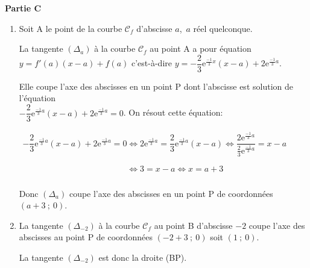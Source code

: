 \documentclass[10pt]{article}
\providecommand{\e}{{\mathrm{e}}}
\begin{document}
\textbf{Partie C}

\medskip

\begin{enumerate}

\item Soit A le point de la courbe $\mathcal{C}_f$ d'abscisse $a$,\, $a$ réel quelconque.

La tangente $\left(\Delta_a\right)$ à la courbe $\mathcal{C}_f$ au point A a pour équation
$y=f'(a) \left (x-a\right )+f(a)$ c'est-à-dire 
$y=-\dfrac{2}{3}\e^{\frac{-1}{3}x}\left (x-a\right )+2\e^{\frac{-1}{3}a}$.

Elle coupe l'axe des abscisses en un point P dont l'abscisse est solution de l'équation \\
$-\dfrac{2}{3}\e^{\frac{-1}{3}a}\left (x-a\right )+2\e^{\frac{-1}{3}a} = 0$.
On résout cette équation:

$\begin{gathered}-\dfrac{2}{3}\e^{\frac{-1}{3}a}\left (x-a\right )+2\e^{\frac{-1}{3}a} = 0
\iff  2\e^{\frac{-1}{3}a} = \dfrac{2}{3}\e^{\frac{-1}{3}a}\left (x-a\right )
\iff \dfrac{2\e^{\frac{-1}{3}a}}{\frac{2}{3}\e^{\frac{-1}{3}a}}=x-a\\
\phantom{-\dfrac{2}{3}\e^{\frac{-1}{3}a}\left (x-a\right )+2\e^{\frac{-1}{3}a} = 0}
\iff 3 = x-a \iff x=a+3\end{gathered}$

Donc $\left(\Delta_a\right)$ coupe l'axe des abscisses en un point P de coordonnées $(a + 3~;~0)$.

\item La tangente $\left(\Delta_{-2}\right)$  à la courbe $\mathcal{C}_f$ au point B d'abscisse $- 2$ coupe l'axe des abscisses au point P de coordonnées $(-2+3~;~0)$ soit $(1~;~0)$.

La tangente $\left(\Delta_{-2}\right)$ est donc la droite (BP).
\end{enumerate}
\end{document}
